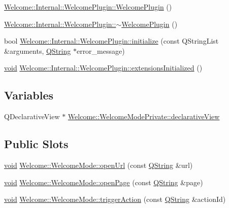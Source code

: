 \begin{DoxyCompactItemize}
\item 
\hyperlink{group___welcome_plugin_gacfac7b166995a1d17463cee3c3f9ba83}{\-Welcome\-::\-Internal\-::\-Welcome\-Plugin\-::\-Welcome\-Plugin} ()
\item 
\hyperlink{group___welcome_plugin_ga5b42a68f1e63d6cbac39b81ee1b809ff}{\-Welcome\-::\-Internal\-::\-Welcome\-Plugin\-::$\sim$\-Welcome\-Plugin} ()
\item 
bool \hyperlink{group___welcome_plugin_gaf4200dea591acb8135c4f4e8e6b42c52}{\-Welcome\-::\-Internal\-::\-Welcome\-Plugin\-::initialize} (const \-Q\-String\-List \&arguments, \hyperlink{group___u_a_v_objects_plugin_gab9d252f49c333c94a72f97ce3105a32d}{\-Q\-String} $\ast$error\-\_\-message)
\item 
\hyperlink{group___u_a_v_objects_plugin_ga444cf2ff3f0ecbe028adce838d373f5c}{void} \hyperlink{group___welcome_plugin_gac1e50ee0aacda1d9e1b3bc829d0d4014}{\-Welcome\-::\-Internal\-::\-Welcome\-Plugin\-::extensions\-Initialized} ()
\end{DoxyCompactItemize}
\subsection*{\-Variables}
\begin{DoxyCompactItemize}
\item 
\-Q\-Declarative\-View $\ast$ \hyperlink{group___welcome_plugin_gaf068be1c7d6cf926c50641b99392b563}{\-Welcome\-::\-Welcome\-Mode\-Private\-::declarative\-View}
\end{DoxyCompactItemize}
\subsection*{\-Public \-Slots}
\begin{DoxyCompactItemize}
\item 
\hyperlink{group___u_a_v_objects_plugin_ga444cf2ff3f0ecbe028adce838d373f5c}{void} \hyperlink{group___welcome_plugin_ga7c451e1e31c9e70b1ba15be45ac25177}{\-Welcome\-::\-Welcome\-Mode\-::open\-Url} (const \hyperlink{group___u_a_v_objects_plugin_gab9d252f49c333c94a72f97ce3105a32d}{\-Q\-String} \&url)
\item 
\hyperlink{group___u_a_v_objects_plugin_ga444cf2ff3f0ecbe028adce838d373f5c}{void} \hyperlink{group___welcome_plugin_gac98c3a91d41a1a3c391d5a4d1fd8ab92}{\-Welcome\-::\-Welcome\-Mode\-::open\-Page} (const \hyperlink{group___u_a_v_objects_plugin_gab9d252f49c333c94a72f97ce3105a32d}{\-Q\-String} \&page)
\item 
\hyperlink{group___u_a_v_objects_plugin_ga444cf2ff3f0ecbe028adce838d373f5c}{void} \hyperlink{group___welcome_plugin_gabf623de0434e61036632f9a4dd3f06d3}{\-Welcome\-::\-Welcome\-Mode\-::trigger\-Action} (const \hyperlink{group___u_a_v_objects_plugin_gab9d252f49c333c94a72f97ce3105a32d}{\-Q\-String} \&action\-Id)
\end{DoxyCompactItemize}


